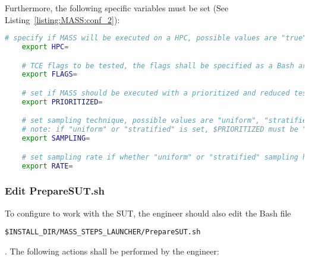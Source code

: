 Furthermore, the following specific \MASS variables must be set (See Listing~\ref{listing:MASS:conf_2}):

\begin{lstlisting}[language=bash, label=listing:MASS:conf_2, caption=\MASS specific variables. Excerpt of mass\_conf.sh file.]
	# specify if MASS will be executed on a HPC, possible values are "true" or "false"
	export HPC=

	# TCE flags to be tested, the flags shall be specified as a Bash array, e.g., ("-O0" "-O1").
	export FLAGS=

	# set if MASS should be executed with a prioritized and reduced test suite, possible values are "true" or "false"
	export PRIORITIZED=

	# set sampling technique, possible values are "uniform", "stratified", and "fsci"
	# note: if "uniform" or "stratified" is set, $PRIORITIZED must be "false"
	export SAMPLING=

	# set sampling rate if whether "uniform" or "stratified" sampling has been selected
	export RATE=
\end{lstlisting}

\subsubsection{Edit PrepareSUT.sh}


To configure \MASS to work with the SUT, the engineer should also edit the Bash file \\\begin{small}\texttt{\$INSTALL\_DIR/MASS\_STEPS\_LAUNCHER/PrepareSUT.sh}\end{small}. The following actions shall be performed by the engineer:

